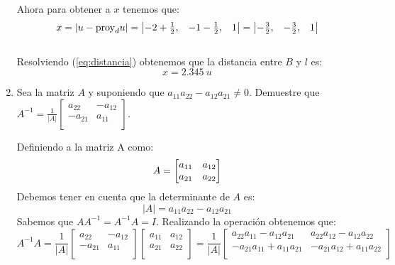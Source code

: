\documentclass[12pt,titlepage]{article}
\begin{document}
\begin{enumerate}
\begin{gather}
 \end{gather}\\
 Ahora para obtener a $x$ tenemos que:
 \begin{equation}
    x=|u-{\rm proy}_du|=\begin{vmatrix}-2+\frac{1}{2},&-1-\frac{1}{2},&1\\\end{vmatrix}=\begin{vmatrix}-\frac{3}{2},&-\frac{3}{2},&1\\\end{vmatrix}\label{eq:distancia}
 \end{equation}\\
 Resolviendo (\ref{eq:distancia}) obtenemos que la distancia entre $B$ y $l$ es:
 \begin{equation}
    x=2.345\ u \nonumber
 \end{equation}
\clearpage
\item Sea la matriz $A$ y suponiendo que $a_{11} a_{22}-a_{12}a_{21}\not= 0$. Demuestre que $A^{-1}=\frac{1}{\left|A\right|}\left[\begin{matrix}a_{22}&-a_{12}\\-a_{21}&a_{11}\\\end{matrix}\right]$.
\par \parskip 8mm
Definiendo a la matriz A como:
\begin{equation} \setcounter{equation}{1}
    A=\left[\begin{matrix}a_{11}&a_{12}\\a_{21}&a_{22}\\\end{matrix}\right]\nonumber
\end{equation}
Debemos tener en cuenta que la determinante de $A$ es:
\begin{equation}
\left|A\right|=a_{11}a_{22}-a_{12}a_{21}\nonumber
\end{equation}
Sabemos que $AA^{-1}=A^{-1}A=I$. Realizando la operación obtenemos que:
\begin{equation}
A^{-1}A=\frac{1}{\left|A\right|}\left[\begin{matrix}a_{22}&-a_{12}\\-a_{21}&a_{11}\\\end{matrix}\right]\left[\begin{matrix}a_{11}&a_{12}\\a_{21}&a_{22}\\\end{matrix}\right]=\frac{1}{\left|A\right|}\left[\begin{matrix}a_{22}a_{11}-a_{12}a_{21}&a_{22}a_{12}-a_{12}a_{22}\\-a_{21}a_{11}+a_{11}a_{21}&-a_{21}a_{12}+a_{11}a_{22}\\\end{matrix}\right]\nonumber

\end{equation}
\end{enumerate}
\end{document}
